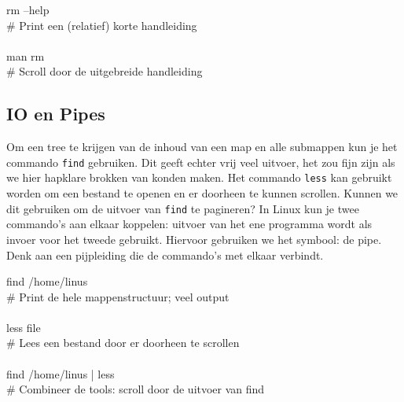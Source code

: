 \begin{bash}
\p[~] rm --help\\
\# Print een (relatief) korte handleiding\\
\\
\p[~] man rm\\
\# Scroll door de uitgebreide handleiding\\
\end{bash}

\subsection{IO en Pipes}\label{io-en-pipes}

Om een tree te krijgen van de inhoud van een map en alle submappen kun je het commando \texttt{find} gebruiken. Dit geeft echter vrij veel uitvoer, het zou fijn zijn als we hier hapklare brokken van konden maken. Het commando \texttt{less} kan gebruikt worden om een bestand te openen en er doorheen te kunnen scrollen. Kunnen we dit gebruiken om de uitvoer van \texttt{find} te pagineren? In Linux kun je twee commando's aan elkaar koppelen: uitvoer van het ene programma wordt als invoer voor het tweede gebruikt. Hiervoor gebruiken we het \texttt{\textbar{}} symbool: de pipe. Denk aan een pijpleiding die de commando's met elkaar verbindt.

\begin{bash}
\p[~] find /home/linus\\
\# Print de hele mappenstructuur; veel output\\
\\
\p[~] less file\\
\# Lees een bestand door er doorheen te scrollen\\
\\
\p[~] find /home/linus | less\\
\# Combineer de tools: scroll door de uitvoer van find\\
\end{bash}


